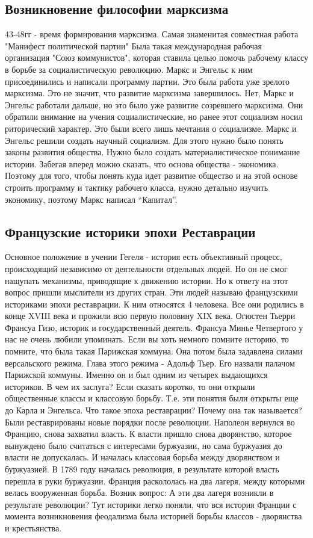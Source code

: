 \subsection{Возникновение философии марксизма}

43-48гг - время формирования марксизма. Самая знаменитая совместная работа "Манифест политической партии" Была такая международная рабочая организация "Союз коммунистов", которая ставила целью помочь рабочему классу в борьбе за социалистическую революцию. Маркс и Энгельс к ним присоединились и написали программу партии. Это была работа уже зрелого марксизма. Это не значит, что развитие марксизма завершилось. Нет, Маркс и Энгельс работали дальше, но это было уже развитие созревшего марксизма. Они обратили внимание на учения социалистические, но ранее этот социализм носил риторический характер. Это были всего лишь мечтания о социализме. Маркс и Энгельс решили создать научный социализм. Для этого нужно было понять законы развития общества. Нужно было создать материалистическое понимание истории. Забегая вперед можно сказать, что основа общества - экономика. Поэтому для того, чтобы понять куда идет развитие общество и на этой основе строить программу и тактику рабочего класса, нужно детально изучить экономику, поэтому Маркс написал “Капитал”.
\subsection{Французские историки эпохи Реставрации}

Основное положение в учении Гегеля - история есть объективный процесс, происходящий независимо от деятельности отдельных людей. Но он не смог нащупать механизмы, приводящие к движению истории. Но к ответу на этот вопрос пришли мыслители из других стран. Эти людей называю французскими историками эпохи реставрации. К ним относятся 4 человека. Все они родились в конце XVIII века и прожили всю первую половину XIX века. Огюстен Тьерри Франсуа Гизо, историк и государственный деятель.
Франсуа Минье Четвертого у нас не очень любили упоминать. Если вы хоть немного помните историю, то помните, что была такая Парижская коммуна. Она потом была задавлена силами версальского режима. Глава этого режима - Адольф Тьер. Его назвали палачом Парижской коммуны. Именно он и был одним из четырех выдающихся историков. В чем их заслуга? Если сказать коротко, то они открыли общественные классы и классовую борьбу. Т.е. эти понятия были открыты еще до Карла и Энгельса. Что такое эпоха реставрации? Почему она так называется? Были реставрированы новые порядки после революции. Наполеон вернулся во Францию, снова захватил власть. К власти пришло снова дворянство, которое вынуждено было считаться с интересами буржуазии, но сама буржуазия до власти не допускалась. И началась классовая борьба между дворянством и буржуазией. В 1789 году началась революция, в результате которой власть перешла в руки буржуазии. Франция раскололась на два лагеря, между которыми велась вооруженная борьба. Возник вопрос: А эти два лагеря возникли в результате революции? Тут историки легко поняли, что вся история Франции с момента возникновения феодализма была историей борьбы классов - дворянства и крестьянства.

